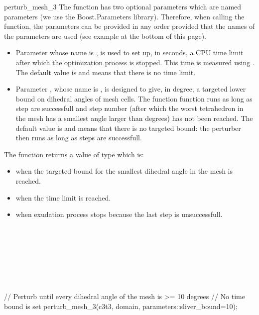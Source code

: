 \begin{ccRefFunction}{perturb_mesh_3}
The function has two optional parameters which are named parameters (we use the Boost.Parameters library). 
Therefore, when calling the function,  the parameters can be provided in any order 
provided that the names of the parameters are used
 (see example at the bottom of this page).
\begin{itemize}
\item
Parameter   whose name is ,
 is used to set up, in seconds,
 a CPU time limit after which the optimization process is stopped. This time is
 measured using .
The default value is  and means that there is no time limit.
\item 
Parameter , whose name is ,
is designed to give, in degree,  a targeted
lower bound on dihedral angles of mesh cells.
The function \ccRefName{} function runs as long as step are successfull
 and  step number  (after which
the worst tetrahedron in the mesh has a smallest angle larger than 
  degrees) has not been reached.
The default value is  and means that  there is no targeted bound: 
the perturber  then runs as long as
steps are successfull.
\end{itemize}




The function \ccRefName{} returns a value of type 
which is:
\begin{itemize}
\item {} when the targeted bound for the smallest dihedral angle in the mesh is reached.
\item{} when the time limit is reached.
\item {} when exudation process stops because the last step is unsuccessfull.
\end{itemize}

\ccSeeAlso

 \\
 \\
 \\
 \\
 \\
 \\


\ccExample
\begin{ccExampleCode}
// Perturb until every dihedral angle of the mesh is >= 10 degrees
// No time bound is set
perturb_mesh_3(c3t3, domain, parameters::sliver_bound=10);
\end{ccExampleCode}

\end{ccRefFunction}

\ccRefPageEnd

